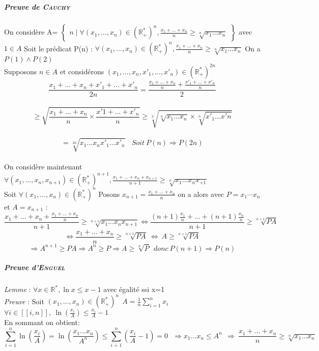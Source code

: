         \subparagraph{Preuve de \textsc{Cauchy}}

            On considère A=
            $\left\{
            \begin{array}{l}
            n\mid\forall (x_1,...,x_n)\in (\mathbb{R} _+^*)^n, \frac{x_1+...+x_n}{n}\geq\sqrt[n]{x_1...x_n}
            \end{array}
            \right\}$
            avec $1\in A$
            Soit le prédicat P(n) : $\forall (x_1,...,x_n)\in (\mathbb{R} _+^*)^n, \frac{x_1+...+x_n}{n}\geq\sqrt[n]{x_1...x_n}$   On a $P(1)\wedge P(2)$
            \\Supposons $n\in A$ et considérons $(x_1,...,x_n,x'_1,...,x'_n)\in (\mathbb{R} _+^*)^{2n}$
            \[\frac{x_1+...+x_n+x'_1+...+x'_n}{2n} =\frac{\frac{x_1+...+x_n}{n} + \frac{x'_1+...+x'_n}{n}}{2}\] \\\[\geq\sqrt{\frac{x_1+...+x_n}{n}\times\frac{x'1+...+x'_n}{n}}\geq\sqrt[2]{\sqrt[n]{x_1...x_n}\times\sqrt[n]{x'_1...x'n}}\] \\\[=\sqrt[2n]{x_1...x_nx'_1...x'_n} ~~~~Soit~P(n)\Rightarrow P(2n)\]
            \\On considère maintenant $\forall (x_1,...,x_n,x_{n+1})\in (\mathbb{R} _+^*)^{n+1}, \frac{x_1+...+x_n+x_{n+1}}{n+1}\geq\sqrt[n]{x_1...x_nx_{+1}}$
            \\Soit $\forall (x_1,...,x_n)\in (\mathbb{R} _+^*)^n$ Posons $x_{n+1}=\frac{x_1+...+x_n}{n}$ on a alors avec $P=x_1\cdots x_n$ et $A = x_{n+1}$ :
            \[\frac{x_1+...+x_n+\frac{x_1+...+x_n}{n}}{n+1}\geq\sqrt[n+1]{x_1...x_nx_{n+1}}
            \Leftrightarrow\frac{(n+1)\frac{x_1}{n} +...+(n+1)\frac{x_n}{n}}{n+1}\geq\sqrt[n+1]{PA}\]
            \[\Leftrightarrow\frac{x_1+...+x_n}{n}\geq\sqrt[n+1]{PA} ~\Leftrightarrow ~A\geq\sqrt[n+1]{PA}\]
            \[\Rightarrow A^{n+1}\geq PA \Rightarrow A^n\geq P\Rightarrow A\geq\sqrt[n]{P} ~~donc~P(n+1)\Rightarrow P(n)\]
        
        \subparagraph{Preuve d'\textsc{Enguel}}
            \textsl{Lemme} : $\forall x\in\mathbb{R} ^*, \ln x\leq x-1$ avec égalité ssi x=1
            \\\textsl{Preuve} : Soit $(x_1,...,x_n)\in (\mathbb{R} _+^*)^n ~~A=\frac{1}{n} \sum\limits_{i=1}^nx_i$
            $\forall i\in [\![i,n]\!] ,~\ln (\frac{x_i}{A})\leq\frac{x_i}{A} -1$
            \\ En sommant on obtient:
            \[\sum\limits_{i=1}^n\ln (\frac{x_i}{A}) = \ln (\frac{x_1...x_n}{A^n})\leq\sum\limits_{i=1}^n (\frac{x_i}{A} -1) = 0~~~
            \Rightarrow x_1...x_n\leq A^n ~~\Rightarrow ~\frac{x_1+...+x_n}{n}\geq\sqrt[n]{x_1...x_n}\] \\ 
    
    \begin{center}
    \fin
    \end{center}
